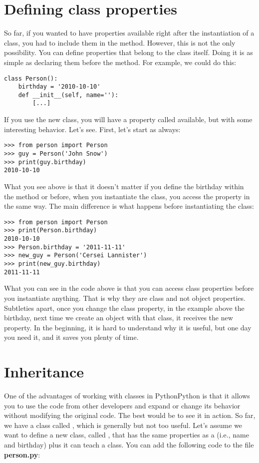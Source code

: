 
\section{Defining class properties}
So far, if you wanted to have properties available right after the instantiation of a class, you had to include them in the  method. However, this is not the only possibility. You can define properties that belong to the class itself. Doing it is as simple as declaring them before the  method. For example, we could do this:

\begin{verbatim}
class Person():
    birthday = '2010-10-10'
    def __init__(self, name=''):
        [...]
\end{verbatim}

If you use the new  class, you will have a property called  available, but with some interesting behavior. Let's see. First, let's start as always:

\begin{verbatim}
>>> from person import Person
>>> guy = Person('John Snow')
>>> print(guy.birthday)
2010-10-10
\end{verbatim}

What you see above is that it doesn't matter if you define the birthday within the  method or before, when you instantiate the class, you access the property in the same way. The main difference is what happens before instantiating the class:

\begin{verbatim}
>>> from person import Person
>>> print(Person.birthday)
2010-10-10
>>> Person.birthday = '2011-11-11'
>>> new_guy = Person('Cersei Lannister')
>>> print(new_guy.birthday)
2011-11-11
\end{verbatim}

What you can see in the code above is that you can access class properties before you instantiate anything. That is why they are class and not object properties. Subtleties apart, once you change the class property, in the example above the birthday, next time we create an object with that class, it receives the new property. In the beginning, it is hard to understand why it is useful, but one day you need it, and it saves you plenty of time.

\section{Inheritance}
One of the advantages of working with classes in PythonPython is that it allows you to use the code from other developers and expand or change its behavior without modifying the original code. The best would be to see it in action. So far, we have a class called , which is generally but not too useful. Let's assume we want to define a new class, called , that has the same properties as a  (i.e., name and birthday) plus it can teach a class. You can add the following code to the file \textbf{person.py}:

